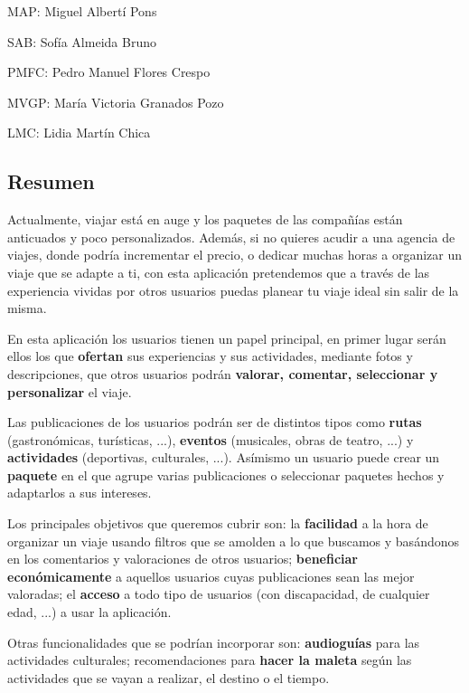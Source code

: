 \documentclass[11pt]{article}
\begin{document}
MAP: Miguel Albertí Pons

SAB: Sofía Almeida Bruno

PMFC: Pedro Manuel Flores Crespo

MVGP: María Victoria Granados Pozo

LMC: Lidia Martín Chica



\subsection{Resumen}
Actualmente, viajar está en auge y los paquetes de las compañías están anticuados y poco personalizados. Además, si no quieres acudir a una agencia de viajes, donde podría incrementar el precio, o dedicar muchas horas a organizar un viaje que se adapte a ti, con esta aplicación pretendemos que a través de las experiencia vividas por otros usuarios puedas planear tu viaje ideal sin salir de la misma.

En esta aplicación los usuarios tienen un papel principal, en primer lugar serán ellos los que \textbf{ofertan} sus experiencias y sus actividades, mediante fotos y descripciones, que otros usuarios podrán \textbf{valorar, comentar, seleccionar y personalizar} el viaje.

Las publicaciones de los usuarios podrán ser de distintos tipos como \textbf{rutas} (gastronómicas, turísticas, ...), \textbf{eventos} (musicales, obras de teatro, ...) y \textbf{actividades} (deportivas, culturales, ...). Asímismo un usuario puede crear un \textbf{paquete} en el que agrupe varias publicaciones o seleccionar paquetes hechos y adaptarlos a sus intereses.

Los principales objetivos que queremos cubrir son: la \textbf{facilidad} a la hora de organizar un viaje usando filtros que se amolden a lo que buscamos y basándonos en los comentarios y valoraciones de otros usuarios; \textbf{beneficiar económicamente} a aquellos usuarios cuyas publicaciones sean las mejor valoradas; el \textbf{acceso} a todo tipo de usuarios (con discapacidad, de cualquier edad, ...) a usar la aplicación.

Otras funcionalidades que se podrían incorporar son: \textbf{audioguías} para las actividades culturales; recomendaciones para \textbf{hacer la maleta} según las actividades que se vayan a realizar, el destino o el tiempo.

\newpage

\end{document}
